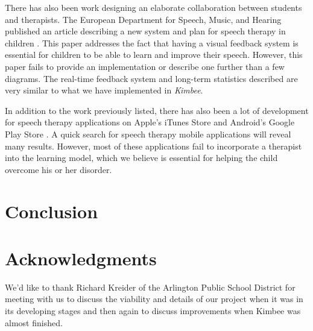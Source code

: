 \documentclass{sig-alternate-2013}
\begin{document}
There has also been work designing an elaborate collaboration between students and therapists. The European Department for Speech, Music, and Hearing published an article describing a new system and plan for speech therapy in children \cite{Oster:EU}. This paper addresses the fact that having a visual feedback system is essential for children to be able to learn and improve their speech. However, this paper fails to provide an implementation or describe one further than a few diagrams. The real-time feedback system and long-term statistics described are very similar to what we have implemented in {\em Kimbee}.

In addition to the work previously listed, there has also been a lot of development for speech therapy applications on Apple's iTunes Store and Android's Google Play Store \cite{Mobile:Apps}. A quick search for speech therapy mobile applications will reveal many results. However, most of these applications fail to incorporate a therapist into the learning model, which we believe is essential for helping the child overcome his or her disorder.

\section{Conclusion}

\section{Acknowledgments}

We'd like to thank Richard Kreider of the Arlington Public School District for meeting with us to discuss the viability and details of our project when it was in its developing stages and then again to discuss improvements when Kimbee was almost finished.




\balancecolumns
\end{document}
